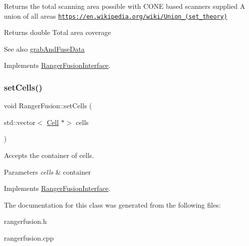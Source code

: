 Returns the total scanning area possible with C\+O\+NE based scanners supplied A union of all areas \href{https://en.wikipedia.org/wiki/Union_(set_theory)}{\tt https\+://en.\+wikipedia.\+org/wiki/\+Union\+\_\+(set\+\_\+theory)} 

\begin{DoxyReturn}{Returns}
double Total area coverage 
\end{DoxyReturn}
\begin{DoxySeeAlso}{See also}
\hyperlink{classRangerFusion_aa9265f72bc3572567c9cf98cf6d9f0e1}{grab\+And\+Fuse\+Data} 
\end{DoxySeeAlso}


Implements \hyperlink{classRangerFusionInterface_a65155605804376da4f67baf3c6f97f40}{Ranger\+Fusion\+Interface}.

\mbox{\label{classRangerFusion_a9b69869bd1e3bca155bcecbad5ea463b}} 
\subsubsection{\texorpdfstring{set\+Cells()}{setCells()}}
{\footnotesize\ttfamily void Ranger\+Fusion\+::set\+Cells (\begin{DoxyParamCaption}\item[{std\+::vector$<$ \hyperlink{classCell}{Cell} $\ast$$>$}]{cells }\end{DoxyParamCaption})\hspace{0.3cm}{\ttfamily [virtual]}}



Accepts the container of cells. 


\begin{DoxyParams}{Parameters}
{\em cells} & container \\
\hline
\end{DoxyParams}


Implements \hyperlink{classRangerFusionInterface_ab8fdee0050521767d33179a63da91e4f}{Ranger\+Fusion\+Interface}.



The documentation for this class was generated from the following files\+:\begin{DoxyCompactItemize}
\item 
rangerfusion.\+h\item 
rangerfusion.\+cpp\end{DoxyCompactItemize}
